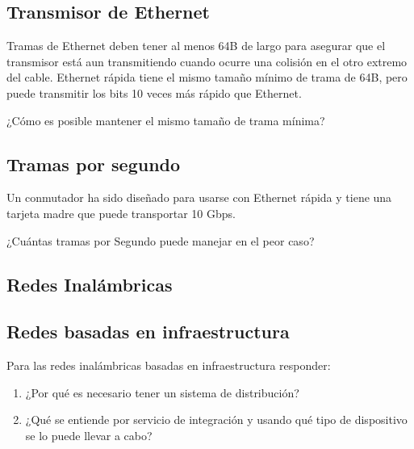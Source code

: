 \documentclass[12pt]{report}
\begin{document}
\begin{exer}
\subsection{Transmisor de Ethernet \stwo \steo}
Tramas de Ethernet deben tener al menos 64B de largo para asegurar que el transmisor está aun transmitiendo cuando ocurre una colisión en el otro extremo del cable. Ethernet rápida tiene el mismo tamaño mínimo de trama de 64B, pero puede transmitir los bits 10 veces más rápido que Ethernet.

¿Cómo es posible mantener el mismo tamaño de trama mínima?
\end{exer}

\begin{exer}
\subsection{Tramas por segundo \stwo}
Un conmutador ha sido diseñado para usarse con Ethernet rápida y tiene una tarjeta madre que puede transportar 10 Gbps. 

¿Cuántas tramas por Segundo puede manejar en el peor caso?
\end{exer}

\begin{exer}
\section{Redes Inalámbricas}
\subsection{Redes basadas en infraestructura \sthree \steo}
Para las redes inalámbricas basadas en infraestructura responder:

\begin{enumerate}
\item ¿Por qué es necesario tener un sistema de distribución?
\item ¿Qué se entiende por servicio de integración y usando qué tipo de dispositivo se lo puede llevar a cabo?
\end{enumerate}
\end{exer}
\end{document}
